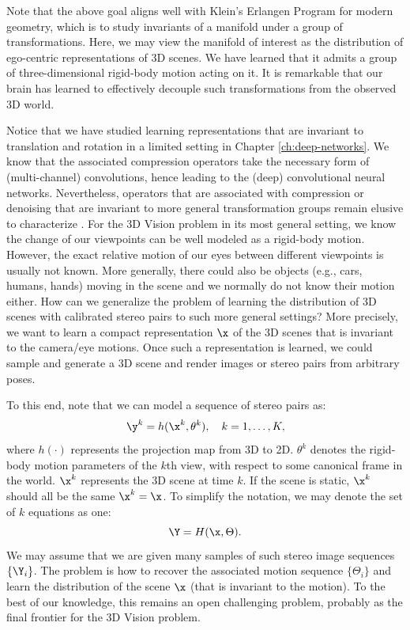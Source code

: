 \documentclass[../../book-main.tex]{subfiles}
\begin{document}
\begin{remark}Note that the above goal aligns well with Klein's
    Erlangen Program for modern geometry, which is to study
    invariants of a manifold under a group of transformations. Here,
    we may view the manifold of interest as the distribution of
    ego-centric representations of 3D scenes. We have learned that it
    admits a group of three-dimensional rigid-body motion acting on
    it. It is remarkable that our brain has learned to effectively
    decouple such transformations from the observed 3D world.
\end{remark}

Notice that we have studied learning representations that are
invariant to translation and rotation in a limited setting in Chapter
\ref{ch:deep-networks}. We know that the associated compression
operators take the necessary form of (multi-channel) convolutions,
hence leading to the (deep) convolutional neural networks.
Nevertheless, operators that are associated with compression or
denoising that are invariant to more general transformation groups
remain elusive to characterize \cite{cohen2016group}.
For the 3D Vision problem in its most general setting, we know the
change of our viewpoints can be well modeled as a rigid-body motion.
However, the exact relative motion of our eyes between different
viewpoints is usually not known. More generally, there could also be
objects (e.g., cars, humans, hands) moving in the scene and we
normally do not know their motion either. How can we generalize the
problem of learning the distribution of 3D scenes with calibrated
stereo pairs to such more general settings? More precisely, we want
to learn a compact representation $\x$ of the 3D scenes that is
invariant to the camera/eye motions. Once such a representation is
learned, we could sample and generate a 3D scene and render images or
stereo pairs from arbitrary poses.

To this end, note that we can model a sequence of stereo pairs as:
\begin{equation}
    \y^k = h(\x^k, \theta^k), \quad k=1, \ldots, K,
\end{equation}
where $h(\cdot)$ represents the projection map from 3D to 2D.
$\theta^k$ denotes the rigid-body motion parameters of the $k$th
view, with respect to some canonical frame in the world. $\x^k$
represents the 3D scene at time $k$. If the scene is static, $\x^k$
should all be the same $\x^k = \x$. To simplify the notation, we may
denote the set of $k$ equations as one:
\begin{equation}
    \Y = H(\x,\Theta).
\end{equation}
We may assume that we are given many samples of such stereo image
sequences $\{\Y_i\}$. The problem is how to recover the associated
motion sequence $\{\Theta_i\}$ and learn the distribution of the
scene $\x$ (that is invariant to the motion). To the best of our
knowledge, this remains an open challenging problem, probably as the
final frontier for the 3D Vision problem.
\end{document}
